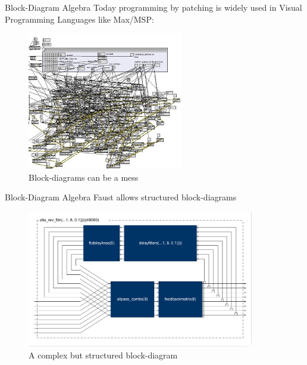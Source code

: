 \begin{frame}[fragile]{Block-Diagram Algebra}
Today programming by patching is widely used in Visual Programming Languages like Max/MSP:

\begin{figure}[h]
\centering
\includegraphics[height=6cm]{images/patch-max-complex}
\caption{Block-diagrams can be a mess}
\label{figure:mess}
\end{figure}
\end{frame}


\begin{frame}[fragile]{Block-Diagram Algebra}
Faust allows structured block-diagrams

\begin{figure}[h]
\centering
\includegraphics[height=6cm]{images/zita-diagram}
\caption{A complex but structured block-diagram}
\label{figure:matrix}
\end{figure}
\end{frame}



